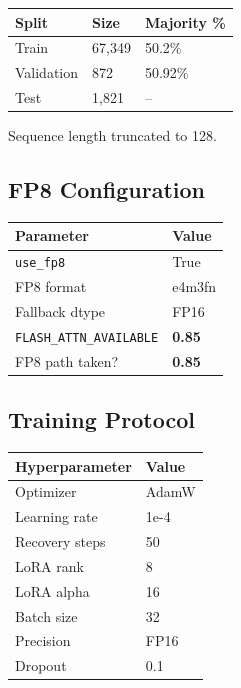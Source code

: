 \begin{table}[H]
\centering
\small
\begin{tabular}{lll}
\toprule
\textbf{Split} & \textbf{Size} & \textbf{Majority \%} \\
\midrule
Train & 67,349 & 50.2\% \\
Validation & 872 & 50.92\% \\
Test & 1,821 & -- \\
\bottomrule
\end{tabular}
\end{table}

Sequence length truncated to 128.

\subsection{FP8 Configuration}

\begin{table}[H]
\centering
\small
\begin{tabular}{ll}
\toprule
\textbf{Parameter} & \textbf{Value} \\
\midrule
\texttt{use\_fp8} & True \\
FP8 format & e4m3fn \\
Fallback dtype & FP16 \\
\texttt{FLASH\_ATTN\_AVAILABLE} & \textbf{0.85} \\
FP8 path taken? & \textbf{0.85} \\
\bottomrule
\end{tabular}
\end{table}

\subsection{Training Protocol}

\begin{table}[H]
\centering
\small
\begin{tabular}{ll}
\toprule
\textbf{Hyperparameter} & \textbf{Value} \\
\midrule
Optimizer & AdamW \\
Learning rate & 1e-4 \\
Recovery steps & 50 \\
LoRA rank & 8 \\
LoRA alpha & 16 \\
Batch size & 32 \\
Precision & FP16 \\
Dropout & 0.1 \\
\bottomrule
\end{tabular}
\end{table}

